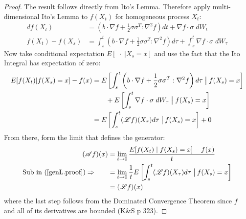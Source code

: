 \documentclass[12pt]{article}
\theoremstyle{plain}
\theoremstyle{definition}
\theoremstyle{remark}
\begin{document}
\begin{proof}
The result follows directly from Ito's Lemma. Therefore apply
multi-dimensional Ito's Lemma to $f(X_t)$ for homogeneous process $X_t$:
\begin{align*}
  df(X_t) &=
  \left(b\cdot \nabla f + \frac{1}{2}\sigma\sigma^T : \nabla^2 f\right)
  dt
  + \nabla f\cdot \sigma \;dW_t\\
  f(X_t) - f(X_s) &=
  \int^t_s
  \left(b\cdot \nabla f + \frac{1}{2}\sigma\sigma^T : \nabla^2 f\right)
  d\tau
  +
  \int^t_s
  \nabla f\cdot \sigma \;dW_\tau
\end{align*}
Now take conditional expectation $E[\;\cdot\;|X_s=x]$ and use the fact
that the Ito Integral has expectation of zero:
\begin{align}
  E[f(X_t)|f(X_s)=x] - f(x) &=
  E\left[
  \int^t_s
  \left(b\cdot \nabla f + \frac{1}{2}\sigma\sigma^T : \nabla^2 f\right)
  d\tau
  \; \big|\; f(X_s)=x\right]\notag\\
  &\qquad
  +
  E\left[
  \int^t_s
  \nabla f\cdot \sigma \;dW_\tau
  \; \big|\;f(X_s)=x\right]
  \notag\\
  &=
  E\left[ \int^t_s (\mathscr{L} f)(X_\tau) d\tau
    \;\big|\:f(X_s)=x\right] + 0
  \label{genL.proof}
\end{align}
From there, form the limit that defines the generator:
\begin{align*}
  (\mathscr{A}f)(x)
  &=\lim_{t\rightarrow0} \frac{E[f(X_t)\;|\;f(X_s)=x] - f(x)}{t}\\
  \text{Sub in (\ref{genL.proof})} \Rightarrow\qquad
  &=\lim_{t\rightarrow0} \frac{1}{t}
  E\left[ \int^t_s (\mathscr{L} f)(X_\tau) d\tau \; \big|\:f(X_s)=x\right]\\
  &=(\mathscr{L}f)(x)
\end{align*}
where the last step follows from the Dominated Convergence Theorem since
$f$ and all of its derivatives are bounded (K\&S p 323).
\end{proof}
\end{document}
